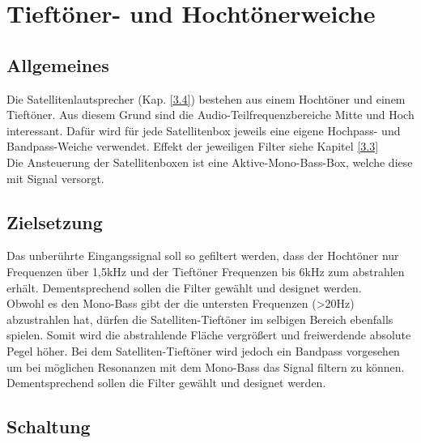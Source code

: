 \null\newpage
\section{Tieftöner- und Hochtönerweiche}\label{sec:5.2}
\subsection{Allgemeines}\label{subsec:5.2.1}
Die Satellitenlautsprecher (Kap. \ref{3.4}) bestehen aus einem Hochtöner und einem Tieftöner. Aus diesem Grund sind die Audio-Teilfrequenzbereiche Mitte und Hoch interessant. Dafür wird  für jede Satellitenbox jeweils eine eigene Hochpass- und Bandpass-Weiche verwendet. Effekt der jeweiligen Filter siehe Kapitel \ref{3.3}\\
Die  Ansteuerung der Satellitenboxen ist eine Aktive-Mono-Bass-Box, welche diese mit Signal versorgt. 

\subsection{Zielsetzung}\label{subsec:5.2.2}
Das unberührte Eingangssignal soll so gefiltert werden, dass der Hochtöner nur Frequenzen über 1,5kHz und der Tieftöner Frequenzen bis 6kHz zum abstrahlen erhält. Dementsprechend sollen die Filter gewählt und designet werden.\\
Obwohl es den Mono-Bass gibt der die untersten Frequenzen (>20Hz) abzustrahlen hat, dürfen die Satelliten-Tieftöner im selbigen Bereich ebenfalls spielen. Somit wird die abstrahlende Fläche vergrößert und freiwerdende absolute Pegel höher. Bei dem Satelliten-Tieftöner wird jedoch ein Bandpass vorgesehen um bei möglichen Resonanzen mit dem Mono-Bass das Signal filtern zu können.\\
Dementsprechend sollen die Filter gewählt und designet werden.

\subsection{Schaltung}\label{subsec:5.2.4}

